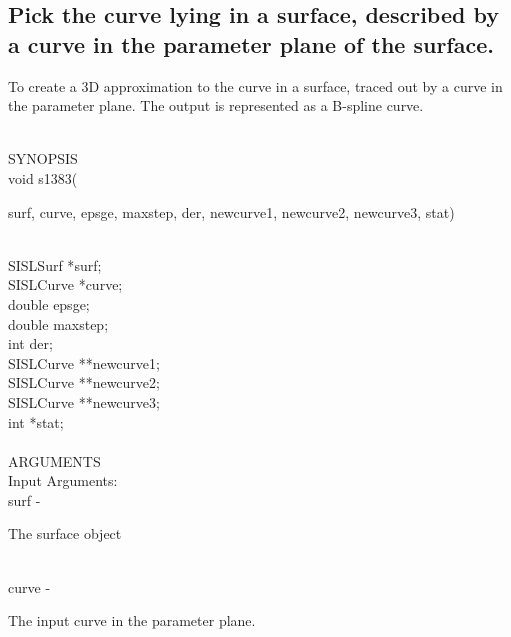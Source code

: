 \subsection{Pick the curve lying in a surface, described by a curve in the parameter plane of
the surface.}
\begin{minipg1}
  To create a 3D approximation to the curve in a surface, traced out by
  a curve in the parameter plane.
  The output is represented as a B-spline curve.
\end{minipg1} \\
SYNOPSIS\\
        \>void s1383(\begin{minipg3}
                        {\fov surf}, {\fov curve}, {\fov epsge}, {\fov maxstep}, {\fov der}, {\fov newcurve1}, {\fov newcurve2}, {\fov newcurve3},
                        stat)
                \end{minipg3}\\[0.3ex]
                \>\>    SISLSurf        \>      *{\fov surf};\\
                \>\>    SISLCurve       \>      *{\fov curve};\\
                \>\>    double  \>      {\fov epsge};\\
                \>\>    double  \>      {\fov maxstep};\\
                \>\>    int     \>      {\fov der};\\
                \>\>    SISLCurve       \>      **{\fov newcurve1};\\
                \>\>    SISLCurve       \>      **{\fov newcurve2};\\
                \>\>    SISLCurve       \>      **{\fov newcurve3};\\
                \>\>    int     \>      *{\fov stat};\\
\\
ARGUMENTS\\
        \>Input Arguments:\\
        \>\>    {\fov surf}\> - \>      \begin{minipg2}
                                The surface object
                                \end{minipg2}\\
        \>\>    {\fov curve}\> - \>     \begin{minipg2}
                                The input curve in the parameter plane.
                                \end{minipg2}\\
